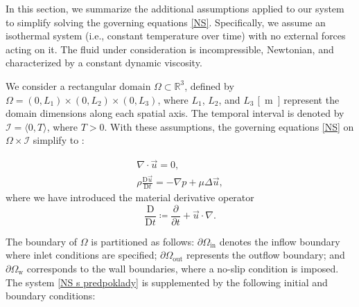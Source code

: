 
In this section, we summarize the additional assumptions applied to our system to simplify solving the governing equations \eqref{NS}. Specifically, we assume an isothermal system (i.e., constant temperature over time) with no external forces acting on it. The fluid under consideration is incompressible, Newtonian, and characterized by a constant dynamic viscosity.

We consider a rectangular domain $ \Omega \subset \mathbb{R}^3 $, defined by $ \Omega = (0, L_1) \times (0, L_2) \times (0, L_3) $, where $ L_1 $, $ L_2 $, and $ L_3 $ \si{[m]} represent the domain dimensions along each spatial axis. The temporal interval is denoted by $ \mathcal{I} = \langle 0, T \rangle $, where $ T > 0 $. With these assumptions, the governing equations \eqref{NS} on $ \Omega \times \mathcal{I} $ simplify to \cite{Schlichting}:

\begin{subequations}\label{NS s predpoklady}
	\begin{gather}
		\label{a s predpoklady}
		\nabla \cdot \vec{u} = 0, \\[5pt]
		\label{b s predpoklady}
		\rho \frac{\text{D} \vec{u}}{\text{D} t} = - \nabla p + \mu \Delta \vec{u},
	\end{gather}
\end{subequations}
where we have introduced the material derivative operator
\begin{equation}
	\dfrac{\text{D}}{\text{D} t} \coloneqq \dfrac{\partial}{\partial t} + \vec{u} \cdot \nabla.
\end{equation}

The boundary of $ \Omega $ is partitioned as follows: $ \partial \Omega_{\text{in}} $ denotes the inflow boundary where inlet conditions are specified; $ \partial \Omega_{\text{out}} $ represents the outflow boundary; and $ \partial \Omega_{\text{w}} $ corresponds to the wall boundaries, where a no-slip condition is imposed. The system \eqref{NS s predpoklady} is supplemented by the following initial and boundary conditions:

